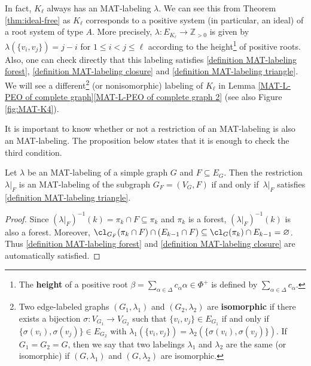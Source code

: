\begin{remark}
\label{rem:complete}
In fact, $ K_{\ell} $ always has an MAT-labeling $\lambda$. 
We can see this from Theorem \ref{thm:ideal-free} as $ K_{\ell} $ corresponds to a positive system (in particular, an ideal) of a root system of type $A$. 
More precisely,  $ \lambda \colon E_{K_{\ell}} \to \mathbb{Z}_{>0} $ is given by $ \lambda(\{v_{i}, v_{j}\}) = j-i$ for $1\le i < j \le \ell$ according to the height\footnote{The \textbf{height} of a positive root $\beta = \sum_{\alpha\in \Delta} c_\alpha \alpha \in \Phi^+$ is defined by $\sum_{\alpha\in \Delta} c_\alpha$.} 
 of positive roots. 
 Also, one can check directly that this labeling satisfies \ref{definition MAT-labeling forest}, \ref{definition MAT-labeling closure} and \ref{definition MAT-labeling triangle}.
We will see a different\footnote{Two edge-labeled graphs $(G_1,\lambda_1)$ and $(G_2, \lambda_2)$ are \textbf{isomorphic} if there exists a bijection $\sigma :V_{G_1} \to V_{G_2}$ such that $\{v_{i}, v_{j}\} \in E_{G_1}$ if and only if $\{\sigma(v_{i}), \sigma(v_{j})\} \in E_{G_2}$   with $ \lambda_1(\{v_{i}, v_{j}\}) =  \lambda_2(\{\sigma(v_{i}), \sigma(v_{j})\})$. If $G_1=G_2=G$, then we say that two labelings $\lambda_1$ and $ \lambda_2$ are the same (or isomorphic) if $(G,\lambda_1)$ and $(G, \lambda_2)$ are isomorphic.}  
(or nonisomorphic) labeling of $ K_{\ell} $ in Lemma \ref{MAT-L-PEO of complete graph}\ref{MAT-L-PEO of complete graph 2} (see also Figure \ref{fig:MAT-K4}). 

\end{remark}

It is important to know whether or not a restriction of an MAT-labeling is also an MAT-labeling. 
The proposition below states that it is enough to check the third condition.
\begin{proposition}\label{restriction to subset}
Let $ \lambda $ be an MAT-labeling of a simple graph $ G $ and $ F \subseteq E_{G} $. 
Then the restriction $ \lambda|_{F} $ is an MAT-labeling of the subgraph $ G_{F}= (V_{G}, F) $ if and only if~$ \lambda|_{F} $ satisfies \ref{definition MAT-labeling triangle}. 
\end{proposition}
\begin{proof}
Since $ (\lambda|_{F})^{-1}(k) = \pi_{k} \cap F \subseteq \pi_{k} $ and $ \pi_{k} $ is a forest, $ (\lambda|_{F})^{-1}(k) $ is also a forest. 
Moreover, $ \cl_{G_{F}}(\pi_{k} \cap F) \cap (E_{k-1} \cap F) \subseteq \cl_{G}(\pi_{k}) \cap E_{k-1} = \varnothing $. 
Thus  \ref{definition MAT-labeling forest} and \ref{definition MAT-labeling closure} are automatically satisfied. 
\end{proof}

